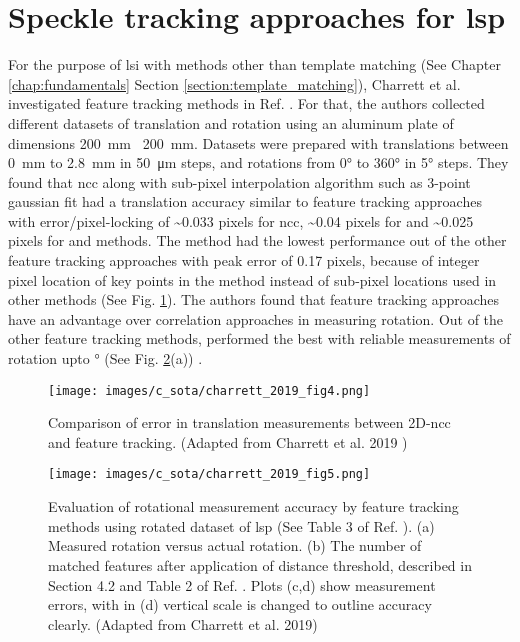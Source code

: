 \clearpage
\section{Speckle tracking approaches for \gls{lsp}}\label{section:speckle_tracking}

For the purpose of \gls{lsi} with methods other than template matching (See Chapter \ref{chap:fundamentals} Section \ref{section:template_matching}), Charrett et al. investigated feature tracking methods in Ref. \cite{charrett_2019}. For that, the authors collected different datasets of translation and rotation using an aluminum plate of dimensions \SI{200}{\milli\meter} \times\ \SI{200}{\milli\meter}. Datasets were prepared with translations between \SI{0}{\milli\meter} to \SI{2.8}{\milli\meter} in \SI{50}{\micro\meter} steps, and rotations from 0° to 360° in 5° steps. They found that \gls{ncc} along with sub-pixel interpolation algorithm such as 3-point gaussian fit \cite{raffel} had a translation accuracy similar to feature tracking approaches with error/pixel-locking of \sim0.033 pixels for \gls{ncc}, \sim0.04 pixels for \cite{brisk_feature} and \sim0.025 pixels for \cite{surf_feature} and \cite{surf_feature} methods. The \cite{orb_feature} method had the lowest performance out of the other feature tracking approaches with peak error of 0.17 pixels, because of integer pixel location of key points in the method instead of sub-pixel locations used in other methods (See Fig. \ref{fig:charrett_2019_fig4}). The authors found that feature tracking approaches have an advantage over correlation approaches in measuring rotation. Out of the other feature tracking methods,  performed the best with reliable measurements of rotation upto ° (See Fig. \ref{fig:charrett_2019_fig5}(a)) \cite{charrett_2019}.


\begin{figure}[h]
    \centering
    \texttt{[image: images/c\_sota/charrett\_2019\_fig4.png]}
    \caption{Comparison of error in translation measurements between 2D-\gls{ncc} and feature tracking. (Adapted from Charrett et al. 2019 \cite{charrett_2019})}
    \label{fig:charrett_2019_fig4}
\end{figure} 

\begin{figure}[h]
    \centering
    \texttt{[image: images/c\_sota/charrett\_2019\_fig5.png]}
    \caption{Evaluation of rotational measurement accuracy by feature tracking methods using rotated dataset of \gls{lsp} (See Table 3 of Ref. \cite{charrett_2019}). (a) Measured rotation versus actual rotation. (b) The number of matched features after application of distance threshold, described in Section 4.2 and Table 2 of Ref. \cite{charrett_2019}. Plots (c,d) show measurement errors, with in (d) vertical scale is changed to outline accuracy clearly. (Adapted from Charrett et al. 2019\cite{charrett_2019})}
    \label{fig:charrett_2019_fig5}
\end{figure} 

